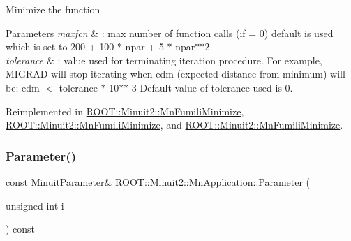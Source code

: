 Minimize the function 
\begin{DoxyParams}{Parameters}
{\em maxfcn} & \+: max number of function calls (if = 0) default is used which is set to 200 + 100 $\ast$ npar + 5 $\ast$ npar$\ast$$\ast$2 \\
\hline
{\em tolerance} & \+: value used for terminating iteration procedure. For example, M\+I\+G\+R\+AD will stop iterating when edm (expected distance from minimum) will be\+: edm $<$ tolerance $\ast$ 10$\ast$$\ast$-\/3 Default value of tolerance used is 0. \\
\hline
\end{DoxyParams}


Reimplemented in \mbox{\hyperlink{classROOT_1_1Minuit2_1_1MnFumiliMinimize_a408e4cc7d16335d7a9bfbb8765acec6d}{R\+O\+O\+T\+::\+Minuit2\+::\+Mn\+Fumili\+Minimize}}, \mbox{\hyperlink{classROOT_1_1Minuit2_1_1MnFumiliMinimize_a58da42cb9def0b42c424a3121987e77b}{R\+O\+O\+T\+::\+Minuit2\+::\+Mn\+Fumili\+Minimize}}, and \mbox{\hyperlink{classROOT_1_1Minuit2_1_1MnFumiliMinimize_a58da42cb9def0b42c424a3121987e77b}{R\+O\+O\+T\+::\+Minuit2\+::\+Mn\+Fumili\+Minimize}}.

\mbox{\label{classROOT_1_1Minuit2_1_1MnApplication_aeb67b1d0ce5b357886d8413c3b166ef2}} 
\subsubsection{\texorpdfstring{Parameter()}{Parameter()}\hspace{0.1cm}{\footnotesize\ttfamily [1/3]}}
{\footnotesize\ttfamily const \mbox{\hyperlink{classROOT_1_1Minuit2_1_1MinuitParameter}{Minuit\+Parameter}}\& R\+O\+O\+T\+::\+Minuit2\+::\+Mn\+Application\+::\+Parameter (\begin{DoxyParamCaption}\item[{unsigned int}]{i }\end{DoxyParamCaption}) const}

\mbox{\label{classROOT_1_1Minuit2_1_1MnApplication_a96f1a9c26e3f8c0de67e3680b127c7c1}} 
